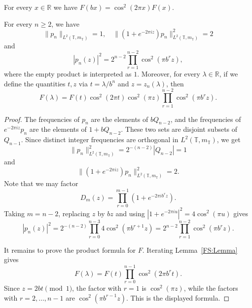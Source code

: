 \documentclass[10pt,a4paper]{amsart}
\def\R{{\mathbb R}}
\def\T{{\mathbb T}}
\begin{document}
\begin{lemma}\label{FS:Lemma}
    For every $x \in \R$ we have $F(bx)=\cos^2(2\pi x)F(x)$.
\end{lemma}

\begin{proposition}\label{prop:test-polynomials}
For every $n\ge2$, we have
\begin{equation*}\label{eq:test-norms}
        \|p_n\|_{L^2(\T,m_\T)}=1,
        \quad
        \|(1+e^{-2\pi iz})p_n\|_{L^2(\T,m_\T)}^2=2
\end{equation*}
and
\begin{equation}\label{eq:pn-product}
        |p_n(z)|^2
        =
        2^{n-2}\prod_{r=1}^{n-2}\cos^2(\pi b^rz),
\end{equation}
where the empty product is interpreted as $1$. Moreover, for every $\lambda \in \R$, if we define the quantities $t,z$ via $t=\lambda/b^n$ and $z=z_n(\lambda)$, then
\begin{equation}\label{eq:F-product}
        F(\lambda)
        =
        F(t)\cos^2(2\pi t)\cos^2(\pi z)
        \prod_{r=1}^{n-2}\cos^2(\pi b^rz).
\end{equation}
\end{proposition}

\begin{proof}
The frequencies of $p_n$ are the elements of $bQ_{n-2}$, and the
frequencies of $e^{-2\pi iz}p_n$ are the elements of $1+bQ_{n-2}$.
These two sets are disjoint subsets of $Q_{n-1}$. Since distinct integer
frequencies are orthogonal in $L^2(\T,m_\T)$, we get
$$
        \|p_n\|_{L^2(\T,m_\T)}^2
        =
        2^{-(n-2)}|Q_{n-2}|
        =
        1
$$
and
$$
        \|(1+e^{-2\pi iz})p_n\|_{L^2(\T,m_\T)}^2
        =
        2.
$$
Note that we may factor
$$
        D_m(z)=\prod_{r=0}^{m-1}\left(1+e^{-2\pi ib^rz}\right).
$$
Taking $m=n-2$, replacing $z$ by $bz$ and using
$
        |1+e^{-2\pi iu}|^2=4\cos^2(\pi u)
$
gives
$$
        |p_n(z)|^2
        =
        2^{-(n-2)}
        \prod_{r=0}^{n-3}4\cos^2(\pi b^{r+1}z)
        =
        2^{n-2}\prod_{r=1}^{n-2}\cos^2(\pi b^rz).
$$

It remains to prove the product formula for $F$. Iterating Lemma~\ref{FS:Lemma} gives
$$
        F(\lambda)
        =
        F(t)\prod_{r=0}^{n-1}\cos^2(2\pi b^rt).
$$
Since $z=2bt\pmod1$, the factor with $r=1$ is
$\cos^2(\pi z)$, while the factors with $r=2,\ldots,n-1$ are
$\cos^2(\pi b^{r-1}z)$. This is the displayed formula.
\end{proof}
\end{document}
